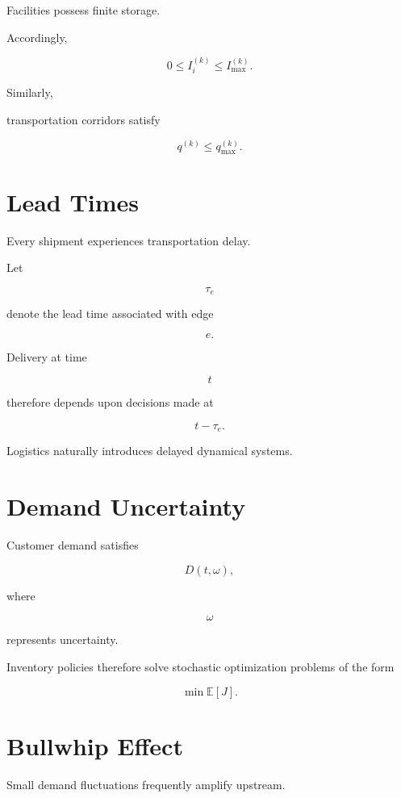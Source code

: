 \documentclass[11pt,fleqn]{book}
\numberwithin{equation}{chapter}
\theoremstyle{plain}
\theoremstyle{definition}
\theoremstyle{remark}
\begin{document}
Facilities possess finite storage.

Accordingly,

\[
0
\le
I_i^{(k)}
\le
I_{\max}^{(k)}.
\]

Similarly,

transportation corridors satisfy

\[
q^{(k)}
\le
q_{\max}^{(k)}.
\]


\section{Lead Times}

Every shipment experiences transportation delay.

Let

\[
\tau_e
\]

denote the lead time associated with edge

\[
e.
\]

Delivery at time

\[
t
\]

therefore depends upon decisions made at

\[
t-\tau_e.
\]

Logistics naturally introduces delayed dynamical systems.


\section{Demand Uncertainty}

Customer demand satisfies

\[
D(t,\omega),
\]

where

\[
\omega
\]

represents uncertainty.

Inventory policies therefore solve stochastic optimization problems of
the form

\[
\boxed{
\min
\mathbb E[J].
}
\]


\section{Bullwhip Effect}

Small demand fluctuations frequently amplify upstream.
\end{document}
